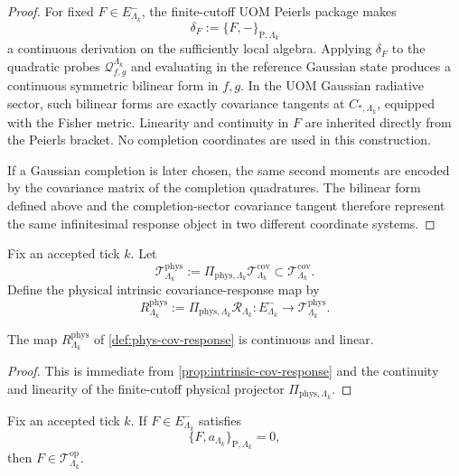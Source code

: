 \documentclass[11pt]{article}
\begin{document}
\begin{proof}
For fixed \(F\in E^-_{\Lambda_k}\), the finite-cutoff UOM Peierls package makes
\[
\delta_F:=\{F,-\}_{\mathrm P,\Lambda_k}
\]
a continuous derivation on the sufficiently local algebra. Applying \(\delta_F\) to the quadratic
probes \(\mathcal Q^{\Lambda_k}_{f,g}\) and evaluating in the reference Gaussian state produces a
continuous symmetric bilinear form in \(f,g\). In the UOM Gaussian radiative sector, such bilinear
forms are exactly covariance tangents at \(C_{\ast,\Lambda_k}\), equipped with the Fisher metric.
Linearity and continuity in \(F\) are inherited directly from the Peierls bracket. No completion
coordinates are used in this construction.

If a Gaussian completion is later chosen, the same second moments are encoded by the covariance
matrix of the completion quadratures. The bilinear form defined above and the completion-sector
covariance tangent therefore represent the same infinitesimal response object in two different
coordinate systems.
\end{proof}

\begin{definition}
\label{def:phys-cov-response}
Fix an accepted tick \(k\). Let
\[
\mathcal T^{\mathrm{phys}}_{\Lambda_k}
:=
\Pi_{\mathrm{phys},\Lambda_k}\mathcal T^{\mathrm{cov}}_{\Lambda_k}
\subset \mathcal T^{\mathrm{cov}}_{\Lambda_k}.
\]
Define the physical intrinsic covariance-response map by
\[
R^{\mathrm{phys}}_{\Lambda_k}
:=
\Pi_{\mathrm{phys},\Lambda_k}\mathcal R_{\Lambda_k}
:
E^-_{\Lambda_k}\to \mathcal T^{\mathrm{phys}}_{\Lambda_k}.
\]
\end{definition}

\begin{proposition}
\label{prop:phys-cov-response}
The map \(R^{\mathrm{phys}}_{\Lambda_k}\) of \cref{def:phys-cov-response} is continuous and linear.
\end{proposition}

\begin{proof}
This is immediate from \cref{prop:intrinsic-cov-response} and the continuity and linearity of the
finite-cutoff physical projector \(\Pi_{\mathrm{phys},\Lambda_k}\).
\end{proof}

\begin{proposition}
\label{prop:char-op-from-a}
Fix an accepted tick \(k\). If \(F\in E^-_{\Lambda_k}\) satisfies
\[
\{F,a_{\Lambda_k}\}_{\mathrm P,\Lambda_k}=0,
\]
then \(F\in\mathcal T^{\mathrm{op}}_{\Lambda_k}\).
\end{proposition}
\end{document}
